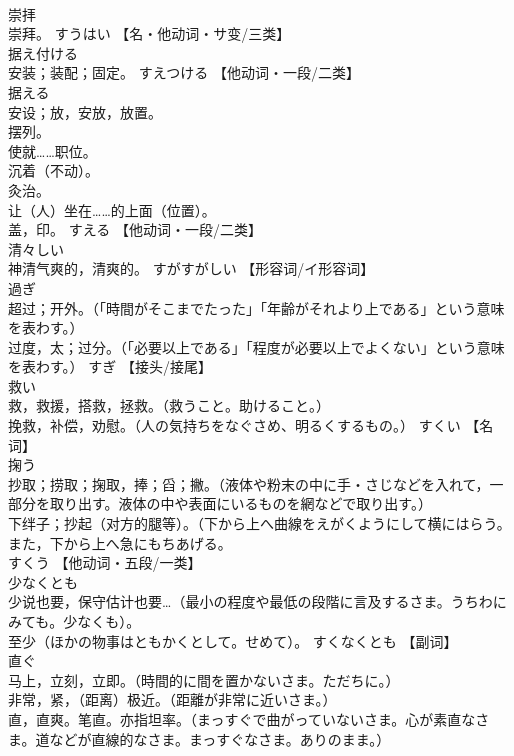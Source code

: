 \documentclass[8pt]{extreport}
\begin{document}
\begin{CJK}{UTF8}{min}
\\	崇拝	
\\	崇拜。	すうはい		【名・他动词・サ变/三类】
\\	据え付ける	
\\	安装；装配；固定。	すえつける		【他动词・一段/二类】
\\	据える	
\\	安设；放，安放，放置。 
\\	摆列。 
\\	使就……职位。 
\\	沉着（不动）。 
\\	灸治。 
\\	让（人）坐在……的上面（位置）。 
\\	盖，印。	すえる		【他动词・一段/二类】
\\	清々しい	
\\	神清气爽的，清爽的。	すがすがしい		【形容词/イ形容词】
\\	過ぎ	
\\	超过；开外。（「時間がそこまでたった」「年齢がそれより上である」という意味を表わす。） 
\\	过度，太；过分。（「必要以上である」「程度が必要以上でよくない」という意味を表わす。）	すぎ		【接头/接尾】
\\	救い	
\\	救，救援，搭救，拯救。（救うこと。助けること。） 
\\	挽救，补偿，劝慰。（人の気持ちをなぐさめ、明るくするもの。）	すくい		【名词】
\\	掬う	
\\	抄取；捞取；掬取，捧；舀；撇。（液体や粉末の中に手・さじなどを入れて，一部分を取り出す。液体の中や表面にいるものを網などで取り出す。） 
\\	下绊子；抄起（对方的腿等）。（下から上へ曲線をえがくようにして横にはらう。また，下から上へ急にもちあげる。 
\\	すくう		【他动词・五段/一类】
\\	少なくとも	
\\	少说也要，保守估计也要…（最小の程度や最低の段階に言及するさま。うちわにみても。少なくも）。 
\\	至少（ほかの物事はともかくとして。せめて）。	すくなくとも		【副词】
\\	直ぐ	
\\	马上，立刻，立即。（時間的に間を置かないさま。ただちに。） 
\\	非常，紧，（距离）极近。（距離が非常に近いさま。） 
\\	直，直爽。笔直。亦指坦率。（まっすぐで曲がっていないさま。心が素直なさま。道などが直線的なさま。まっすぐなさま。ありのまま。） 

\end{CJK}
\end{document}
